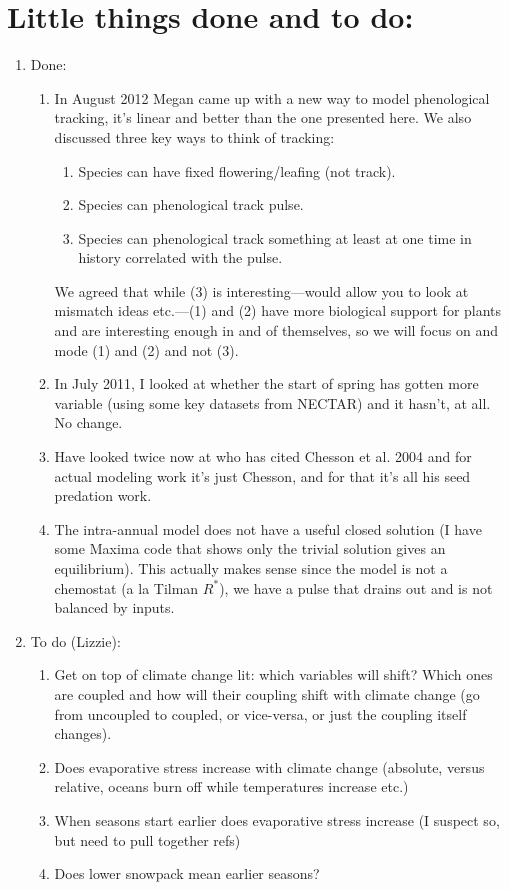 \documentclass[11pt,a4paper,oneside]{article}
\begin{document}
\section{Little things done and to do:}
\begin{enumerate}
\item Done:
\begin{enumerate}
\item In August 2012 Megan came up with a new way to model phenological tracking, it's linear and better than the one presented here. We also discussed three key ways to think of tracking:
\begin{enumerate}
\item Species can have fixed flowering/leafing (not track).
\item Species can phenological track pulse.
\item Species can phenological track something at least at one time in history correlated with the pulse.
\end{enumerate}
We agreed that while (3) is interesting---would allow you to look at mismatch ideas etc.---(1) and (2) have more biological support for plants and are interesting enough in and of themselves, so we will focus on and mode (1) and (2) and not (3).
\item In July 2011, I looked at whether the start of spring
has gotten more variable (using some key datasets from NECTAR) and it
hasn't, at all. No change.
\item  Have looked twice now at who has cited Chesson et al. 2004
and for actual modeling work it's just Chesson, and for that it's all
his seed predation work.
\item The intra-annual model does not have a useful closed solution (I
  have some Maxima code that shows only the trivial solution gives an
  equilibrium). This actually makes sense since the model is not a
  chemostat (a la Tilman \(R^{*}\)), we have a pulse that drains out
  and is not balanced by inputs.
\end{enumerate}
\item To do (Lizzie):
\begin{enumerate}
\item Get on top of climate change lit: which variables will shift?
  Which ones are coupled and how will their coupling shift with
  climate change (go from uncoupled to coupled, or vice-versa, or just
  the coupling itself changes). 
\item Does evaporative stress increase with climate change (absolute,
  versus relative, oceans burn off while temperatures increase etc.)
\item When seasons start earlier does evaporative stress increase (I
  suspect so, but need to pull together refs)
\item Does lower snowpack mean earlier seasons?
\end{enumerate}
\end{enumerate}
\end{document}

